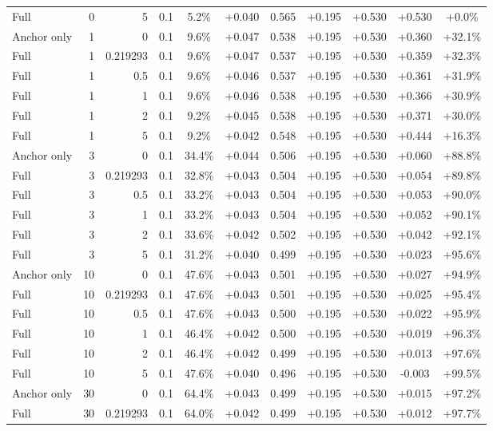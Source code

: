 \begin{table}[htbp]
\begin{tabular}{lrrrccccccc}
Full & 0 & 5 & 0.1 & 5.2\% & +0.040 & 0.565 & +0.195 & +0.530 & +0.530 & +0.0\% \\
Anchor only & 1 & 0 & 0.1 & 9.6\% & +0.047 & 0.538 & +0.195 & +0.530 & +0.360 & +32.1\% \\
Full & 1 & 0.219293 & 0.1 & 9.6\% & +0.047 & 0.537 & +0.195 & +0.530 & +0.359 & +32.3\% \\
Full & 1 & 0.5 & 0.1 & 9.6\% & +0.046 & 0.537 & +0.195 & +0.530 & +0.361 & +31.9\% \\
Full & 1 & 1 & 0.1 & 9.6\% & +0.046 & 0.538 & +0.195 & +0.530 & +0.366 & +30.9\% \\
Full & 1 & 2 & 0.1 & 9.2\% & +0.045 & 0.538 & +0.195 & +0.530 & +0.371 & +30.0\% \\
Full & 1 & 5 & 0.1 & 9.2\% & +0.042 & 0.548 & +0.195 & +0.530 & +0.444 & +16.3\% \\
Anchor only & 3 & 0 & 0.1 & 34.4\% & +0.044 & 0.506 & +0.195 & +0.530 & +0.060 & +88.8\% \\
Full & 3 & 0.219293 & 0.1 & 32.8\% & +0.043 & 0.504 & +0.195 & +0.530 & +0.054 & +89.8\% \\
Full & 3 & 0.5 & 0.1 & 33.2\% & +0.043 & 0.504 & +0.195 & +0.530 & +0.053 & +90.0\% \\
Full & 3 & 1 & 0.1 & 33.2\% & +0.043 & 0.504 & +0.195 & +0.530 & +0.052 & +90.1\% \\
Full & 3 & 2 & 0.1 & 33.6\% & +0.042 & 0.502 & +0.195 & +0.530 & +0.042 & +92.1\% \\
Full & 3 & 5 & 0.1 & 31.2\% & +0.040 & 0.499 & +0.195 & +0.530 & +0.023 & +95.6\% \\
Anchor only & 10 & 0 & 0.1 & 47.6\% & +0.043 & 0.501 & +0.195 & +0.530 & +0.027 & +94.9\% \\
Full & 10 & 0.219293 & 0.1 & 47.6\% & +0.043 & 0.501 & +0.195 & +0.530 & +0.025 & +95.4\% \\
Full & 10 & 0.5 & 0.1 & 47.6\% & +0.043 & 0.500 & +0.195 & +0.530 & +0.022 & +95.9\% \\
Full & 10 & 1 & 0.1 & 46.4\% & +0.042 & 0.500 & +0.195 & +0.530 & +0.019 & +96.3\% \\
Full & 10 & 2 & 0.1 & 46.4\% & +0.042 & 0.499 & +0.195 & +0.530 & +0.013 & +97.6\% \\
Full & 10 & 5 & 0.1 & 47.6\% & +0.040 & 0.496 & +0.195 & +0.530 & -0.003 & +99.5\% \\
Anchor only & 30 & 0 & 0.1 & 64.4\% & +0.043 & 0.499 & +0.195 & +0.530 & +0.015 & +97.2\% \\
Full & 30 & 0.219293 & 0.1 & 64.0\% & +0.042 & 0.499 & +0.195 & +0.530 & +0.012 & +97.7\% \\

\end{tabular}
\end{table}
